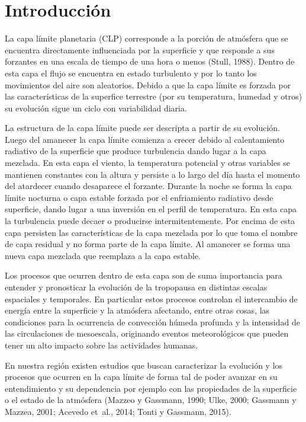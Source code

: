 \documentclass[12pt,spanish,oneside, a4paper]{book}
\begin{document}
\setcounter{tocdepth}{4} \tableofcontents

\listoffigures
\newpage

\listoftables
\newpage

\chapter{Introducción}\label{introduccion}

La capa límite planetaria (CLP) corresponde a la porción de atmósfera
que se encuentra directamente influenciada por la superficie y que
responde a sus forzantes en una escala de tiempo de una hora o menos
(Stull, 1988). Dentro de esta capa el flujo se encuentra en estado
turbulento y por lo tanto los movimientos del aire son aleatorios.
Debido a que la capa límite es forzada por las características de la
superfice terrestre (por su temperatura, humedad y otros) su evolución
sigue un ciclo con variabilidad diaria.

La estructura de la capa límite puede ser descripta a partir de su
evolución. Luego del amanecer la capa límite comienza a crecer debido al
calentamiento radiativo de la superficie que produce turbulencia dando
lugar a la capa mezclada. En esta capa el viento, la temperatura
potencial y otras variables se mantienen constantes con la altura y
persiste a lo largo del día hasta el momento del atardecer cuando
desaparece el forzante. Durante la noche se forma la capa límite
nocturna o capa estable forzada por el enfriamiento radiativo desde
superficie, dando lugar a una inversión en el perfil de temperatura. En
esta capa la turbulencia puede decaer o producirse intermitentemente.
Por encima de esta capa persisten las características de la capa
mezclada por lo que toma el nombre de capa residual y no forma parte de
la capa límite. Al amanecer se forma una nueva capa mezclada que
reemplaza a la capa estable.

Los procesos que ocurren dentro de esta capa son de suma importancia
para entender y pronosticar la evolución de la tropopausa en distintas
escalas espaciales y temporales. En particular estos procesos controlan
el intercambio de energía entre la superficie y la atmósfera afectando,
entre otras cosas, las condiciones para la ocurrencia de convección
húmeda profunda y la intensidad de las circulaciones de mesoescala,
originando eventos meteorológicos que pueden tener un alto impacto sobre
las actividades humanas.

En nuestra región existen estudios que buscan caracterizar la evolución
y los procesos que ocurren en la capa límite de forma tal de poder
avanzar en su entendimiento y su dependencia por ejemplo con las
propiedades de la superficie o el estado de la atmósfera (Mazzeo y
Gassmann, 1990; Ulke, 2000; Gassmann y Mazzea, 2001; Acevedo et~al.,
2014; Tonti y Gassmann, 2015).
\end{document}
